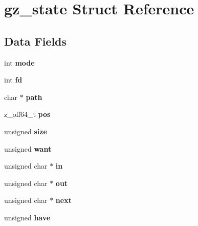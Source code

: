\hypertarget{structgz__state}{}\section{gz\+\_\+state Struct Reference}
\label{structgz__state}
\subsection*{Data Fields}
\begin{DoxyCompactItemize}
\item 
\mbox{\label{structgz__state_aaded3d8b2702b1bfabe3141e6f772b1a}} 
int {\bfseries mode}
\item 
\mbox{\label{structgz__state_a5963abca9e640ff2aa40b517f9cffc2c}} 
int {\bfseries fd}
\item 
\mbox{\label{structgz__state_ad52b106362f7262800d7224ff90fdd16}} 
char $\ast$ {\bfseries path}
\item 
\mbox{\label{structgz__state_a2437a6feaf9c00cb127f5ac360018b9b}} 
z\+\_\+off64\+\_\+t {\bfseries pos}
\item 
\mbox{\label{structgz__state_a36b86ed64aca8f022ec0f3411663fe24}} 
unsigned {\bfseries size}
\item 
\mbox{\label{structgz__state_abee992fb115f9f118377b9f46d14b2a5}} 
unsigned {\bfseries want}
\item 
\mbox{\label{structgz__state_af16c5730c48518809ead34557d612942}} 
unsigned char $\ast$ {\bfseries in}
\item 
\mbox{\label{structgz__state_ad83d10502587255806fd712109867106}} 
unsigned char $\ast$ {\bfseries out}
\item 
\mbox{\label{structgz__state_ab0fe46e40d8980befc2033400137db37}} 
unsigned char $\ast$ {\bfseries next}
\item 
\mbox{\label{structgz__state_aa658215ab2d34e8bcaac3dedcb6d2616}} 
unsigned {\bfseries have}
\item 

\end{DoxyCompactItemize}
